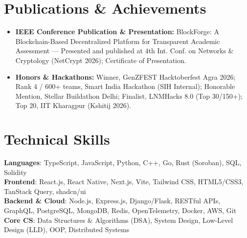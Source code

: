 \documentclass[letterpaper,11pt]{article}
\newcommand{\resumeItem}[1]{
  \item\small{
    {#1 \vspace{-5pt}}
  }
}
\begin{document}
\section{Publications \& Achievements}
  \begin{itemize}[leftmargin=0.15in]
    \resumeItem{\textbf{IEEE Conference Publication \& Presentation:} BlockForge: A Blockchain-Based Decentralized Platform for Transparent Academic Assessment --- Presented and published at 4th Int. Conf. on Networks \& Cryptology (NetCrypt 2026); Certificate of Presentation.}
    \resumeItem{\textbf{Honors \& Hackathons:} Winner, GenZFEST Hacktoberfest Agra 2026; Rank 4 / 600+ teams, Smart India Hackathon (SIH Internal); Honorable Mention, Stellar Buildathon Delhi; Finalist, LNMHacks 8.0 (Top 30/150+); Top 20, IIT Kharagpur (Kshitij 2026).}
  \end{itemize}

\section{Technical Skills}
  \begin{itemize}[leftmargin=0.15in, label={}]
    \small{\item{
      \textbf{Languages}{: TypeScript, JavaScript, Python, C++, Go, Rust (Soroban), SQL, Solidity} \\
      \textbf{Frontend}{: React.js, React Native, Next.js, Vite, Tailwind CSS, HTML5/CSS3, TanStack Query, shadcn/ui} \\
      \textbf{Backend \& Cloud}{: Node.js, Express.js, Django/Flask, RESTful APIs, GraphQL, PostgreSQL, MongoDB, Redis, OpenTelemetry, Docker, AWS, Git} \\
      \textbf{Core CS}{: Data Structures \& Algorithms (DSA), System Design, Low-Level Design (LLD), OOP, Distributed Systems}
    }}
  \end{itemize}
\end{document}
